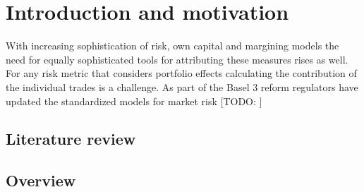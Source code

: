 \documentclass[../Thesis_AHoecherl.tex]{subfiles}
\begin{document}
    \section{Introduction and motivation}

    With increasing sophistication of risk, own capital and margining models the need for equally sophisticated tools for attributing these measures rises as well. For any risk metric that considers portfolio effects calculating the contribution of the individual trades is a challenge. As part of the Basel 3 reform regulators have updated the standardized models for market risk [TODO: ] 
    \subsection{Literature review}
    \subsection{Overview}
\end{document}
